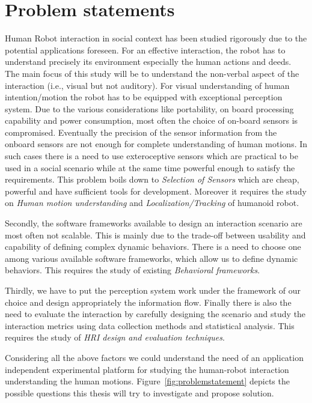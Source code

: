 \section{Problem statements}
\label{sec:problem_statement}
	Human Robot interaction in social context has been studied rigorously due to the potential applications foreseen. For an effective interaction, the robot has to understand precisely its environment especially the human actions and deeds. The main focus of this study will be to understand the non-verbal aspect of the interaction (i.e., visual but not auditory). For visual understanding of human intention/motion the robot has to be equipped with exceptional perception system. Due to the various considerations like portability, on board processing capability and power consumption, most often the choice of on-board sensors is compromised. Eventually the precision of the sensor information from the onboard sensors are not enough for complete understanding of human motions. In such cases there is a need to use exteroceptive sensors which are practical to be used in a social scenario while at the same time powerful enough to satisfy the requirements. This problem boils down to \emph{Selection of Sensors} which are cheap, powerful and have sufficient tools for development. Moreover it requires the study on \emph{Human motion understanding} and \emph{Localization/Tracking} of humanoid robot.
	
	Secondly, the software frameworks available to design an interaction scenario are most often not scalable. This is mainly due to the trade-off between usability and capability of defining complex dynamic behaviors. There is a need to choose one among various available software frameworks, which allow us to define dynamic behaviors. This requires the study of existing \emph{Behavioral frameworks}.

	Thirdly, we have to put the perception system work under the framework of our choice and design appropriately the information flow. Finally there is also the need to evaluate the interaction by carefully designing the scenario and study the interaction metrics using data collection methods and statistical analysis. This requires the study of \emph{HRI design and evaluation techniques}.

	Considering all the above factors we could understand the need of an application independent experimental platform for studying the human-robot interaction understanding the human motions. Figure~\ref{fig:problemstatement} depicts the possible questions this thesis will try to investigate and propose solution. 

